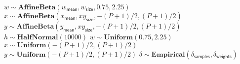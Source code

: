 \begin{algorithm}
\begin{algorithmic}[1]
                \State $w \sim \mathbf{AffineBeta}(w_\mathsf{mean}, w_\mathsf{size}, 0.75, 2.25)$
                \State $x \sim \mathbf{AffineBeta} \left( x_\mathsf{mean}, xy_\mathsf{size}, -(P+1)/2, (P+1)/2 \right) $
                \State $y \sim \mathbf{AffineBeta} \left( y_\mathsf{mean}, xy_\mathsf{size}, -(P+1)/2, (P+1)/2 \right)$
                \State $h \sim \mathbf{HalfNormal}(10000)$
                \State $w \sim \mathbf{Uniform}(0.75, 2.25)$
                \State $x \sim \mathbf{Uniform}(-(P+1)/2, (P+1)/2)$
                \State $y \sim \mathbf{Uniform}(-(P+1)/2, (P+1)/2)$
            \EndIf
        \EndFor
            \State $\delta \sim \mathbf{Empirical}( \delta_\mathsf{samples}, \delta_\mathsf{weights})$
        \EndFor
    \EndFor
\EndFor
\end{algorithmic}
\end{algorithm}